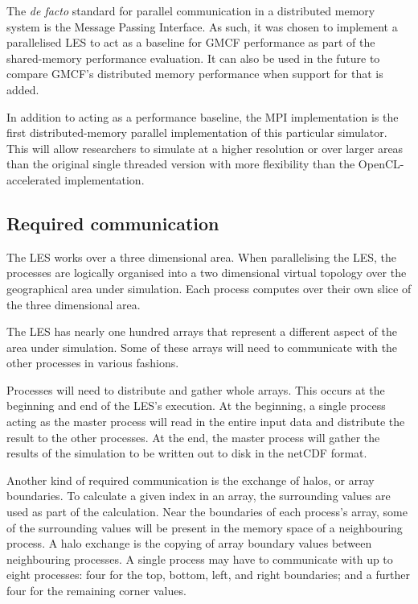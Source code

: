 The \textit{de facto} standard for parallel communication in a distributed
memory system is the Message Passing Interface. As such, it was chosen to
implement a parallelised LES to act as a baseline for GMCF performance as part
of the shared-memory performance evaluation. It can also be used in the future
to compare GMCF's distributed memory performance when support for that is added.

In addition to acting as a performance baseline, the MPI implementation is the
first distributed-memory parallel implementation of this particular simulator.
This will allow researchers to simulate at a higher resolution or over larger
areas than the original single threaded version with more flexibility than the
OpenCL-accelerated implementation.

\subsection{Required communication}

The LES works over a three dimensional area. When parallelising the LES, the
processes are logically organised into a two dimensional virtual topology over
the geographical area under simulation. Each process computes over their own
slice of the three dimensional area.

The LES has nearly one hundred arrays that represent a different aspect of the
area under simulation. Some of these arrays will need to communicate with the
other processes in various fashions.

Processes will need to distribute and gather whole arrays. This occurs at the
beginning and end of the LES's execution. At the beginning, a single process
acting as the master process will read in the entire input data and distribute
the result to the other processes. At the end, the master process will gather
the results of the simulation to be written out to disk in the netCDF format.

Another kind of required communication is the exchange of halos, or array
boundaries. To calculate a given index in an array, the surrounding values are
used as part of the calculation. Near the boundaries of each process's array,
some of the surrounding values will be present in the memory space of a
neighbouring process. A halo exchange is the copying of array boundary values
between neighbouring processes. A single process may have to communicate with up
to eight processes: four for the top, bottom, left, and right boundaries; and a
further four for the remaining corner values.

